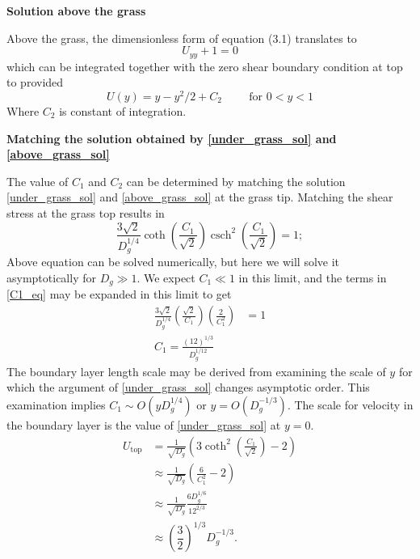 \documentclass[letterpaper,10pt]{article}
\DeclareMathOperator{\csch}{csch}
\begin{document}
\vspace{2mm}
\noindent
\textbf{Solution above the grass}

\noindent
Above the grass, the dimensionless form of equation (3.1) translates to
\begin{equation}
 U_{yy}+1=0
\end{equation}
which can be integrated together with the zero shear boundary condition at top to provided
\begin{equation}
 U(y) = y-y^2/2+C_2 \hspace{1cm} \text{for $0<y<1$}
 \label{above_grass_sol}
\end{equation}
Where $C_2$ is constant of integration.

\vspace{2mm}
\noindent
\textbf{Matching the solution obtained by \eqref{under_grass_sol} and \eqref{above_grass_sol} }

\noindent
The value of $C_1$ and $C_2$ can be determined by matching the solution \eqref{under_grass_sol} and \eqref{above_grass_sol} at the grass tip.
Matching the shear stress at the grass top results in
\begin{equation}
\frac{3\sqrt{2}}{D_g^{1/4}} \coth\left(\dfrac{C_1}{\sqrt{2}}\right) \csch^2\left(\dfrac{C_1}{\sqrt{2}}\right) = 1;
\label{C1_eq}
\end{equation}
Above equation can be solved numerically, but here we will solve it asymptotically for $D_g \gg 1$. We expect $C_1 \ll 1$ in this limit, and the terms in \eqref{C1_eq} may be expanded in this limit to get
\begin{equation}
\begin{split}
\frac{3\sqrt{2}}{D_g^{1/4}} \left( \frac{\sqrt{2}}{C_1} \right) \left( \frac{2}{C_1^2} \right) &= 1 \\
C_1 = \frac{(12)^{1/3}}{D_g^{1/12}}
\end{split}
\end{equation}
The boundary layer length scale may be derived from examining the scale of $y$ for which the argument of \eqref{under_grass_sol} changes asymptotic order. This examination implies $C_1 \sim O(y D_g^{1/4})$ or $y = O(D_g^{-1/3})$. The scale for velocity in the boundary layer is the value of \eqref{under_grass_sol} at $y=0$.
\begin{align}
 U_\text{top} &=  \frac{1}{\sqrt{D_g}} \left( 3 \coth^2 \left(\frac{C_1}{\sqrt{2}}  \right)-2    \right) \\
              &\approx  \frac{1}{\sqrt{D_g}} \left( \frac{6}{C_1^2} -2    \right) \\
              &\approx \frac{1}{\sqrt{D_g}} \frac{6D_g^{1/6}}{12^{2/3}} \\
              &\approx \left( \dfrac{3}{2} \right)^{1/3} D_g^{-1/3}.
\end{align}
\end{document}
